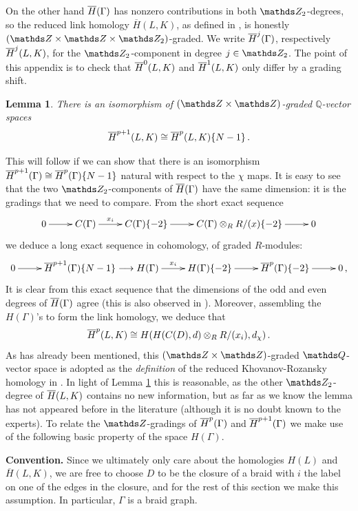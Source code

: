 \documentclass{compositio}
\newtheorem{lemma}[theorem]{Lemma}
\theoremstyle{definition}
\numberwithin{equation}{section}
\begin{document}
On the other hand $\overline{H}(\Gamma)$ has nonzero contributions in both $\Ztwo$-degrees, so the reduced link homology $\overline{H}(L,K)$, as defined in \cite{kr0401268}, is honestly $(\ZZ \times \ZZ \times \Ztwo)$-graded. We write $\overline{H}^j(\Gamma)$, respectively $\overline{H}^j(L,K)$, for the $\Ztwo$-component in degree $j \in \Ztwo$. The point of this appendix is to check that $\overline{H}^0(L,K)$ and $\overline{H}^1(L,K)$ only differ by a grading shift.

\begin{lemma}\label{lemma:redvsunred} There is an isomorphism of $(\ZZ \times \ZZ)$-graded $\mathds{Q}$-vector spaces 
\[
\overline{H}^{p+1}(L,K) \cong \overline{H}^{p}(L,K)\{N-1\} \, .
\]
\end{lemma}

This will follow if we can show that there is an isomorphism $\overline{H}^{p+1}(\Gamma) \cong \overline{H}^p(\Gamma)\{N-1\}$ natural with respect to the $\chi$ maps. It is easy to see that the two $\Ztwo$-components of $\overline{H}(\Gamma)$ have the same dimension: it is the gradings that we need to compare. From the short exact sequence
\[
\xymatrix{%
0 \ar[r] & C(\Gamma) \ar[r]^-{x_{i}} & C(\Gamma)\{-2\} \ar[r] & C(\Gamma) \otimes_R R/(x)\{-2\} \ar[r] & 0
}
\]
we deduce a long exact sequence in cohomology, of graded $R$-modules:
\begin{equation}\label{eq:redvsunred_seq}
\xymatrix{%
0 \ar[r] & \redh^{p+1}(\Gamma)\{N-1\} \lto H(\Gamma) \ar[r]^-{x_{i}} & H(\Gamma)\{-2\} \ar[r] & \redh^p(\Gamma)\{-2\} \ar[r] & 0 \, ,
}
\end{equation}
It is clear from this exact sequence that the dimensions of the odd and even degrees of $\overline{H}(\Gamma)$ agree (this is also observed in \cite[Proposition 3.12]{r0607544}). Moreover, assembling the $H(\Gamma)$'s to form the link homology, we deduce that
\[
\overline{H}^p(L, K) \cong H(H(C(D),d) \otimes_R R/(x_i), d_{\chi})\,.
\]
As has already been mentioned, this $(\ZZ \times \ZZ)$-graded $\QQ$-vector space is adopted as the \emph{definition} of the reduced Khovanov-Rozansky homology in \cite{r0607544,websterblah, rasmussenblah}. In light of Lemma \ref{lemma:redvsunred} this is reasonable, as the other $\Ztwo$-degree of $\overline{H}(L,K)$ contains no new information, but as far as we know the lemma has not appeared before in the literature (although it is no doubt known to the experts). To relate the $\ZZ$-gradings of $\overline{H}^p(\Gamma)$ and $\overline{H}^{p+1}(\Gamma)$ we make use of the following basic property of the space $H(\Gamma)$.

\textbf{Convention.} Since we ultimately only care about the homologies $H(L)$ and $\overline{H}(L,K)$, we are free to choose $D$ to be the closure of a braid with $i$ the label on one of the edges in the closure, and for the rest of this section we make this assumption. In particular, $\Gamma$ is a braid graph.
\end{document}
